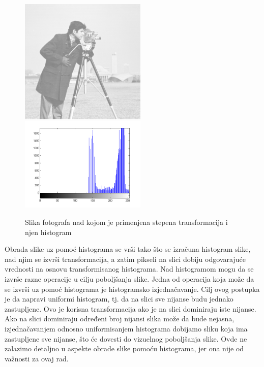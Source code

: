 \documentclass[a4paper,12pt,titlepage]{article}
\begin{document}
\begin{figure}[ht!]
\centering
\includegraphics[width=60mm]{img/imgPow2.png}
\includegraphics[width=60mm]{img/histImgPow2.png}
\caption{Slika fotografa nad kojom je primenjena stepena transformacija i njen histogram}
\label{overflow}
\end{figure}

Obrada slike uz pomoć histograma se vrši tako što se izračuna histogram slike, nad njim se izvrši transformacija, a zatim pikseli na slici dobiju odgovarajuće vrednosti na osnovu transformisanog histograma. Nad histogramom mogu da se izvrše razne operacije u cilju poboljšanja slike. 
Jedna od operacija koja može da se izvrši uz pomoć histograma je histogramsko izjednačavanje. Cilj ovog postupka je da napravi uniformi histogram, tj. da na slici sve nijanse budu jednako zastupljene. Ovo je korisna transformacija ako je na slici dominiraju iste nijanse. Ako na slici dominiraju određeni broj nijansi slika može da bude nejasna, izjednačavanjem odnosno uniformisanjem histograma dobijamo sliku koja ima zastupljene sve nijanse, što će dovesti do vizuelnog poboljšanja slike. Ovde ne zalazimo detaljno u aspekte obrade slike pomoću histograma, jer ona nije od važnosti za ovaj rad.
\end{document}
